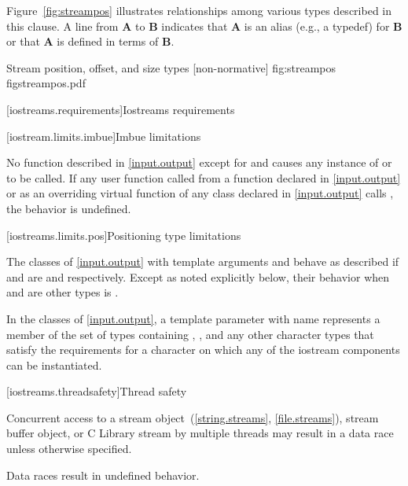 \pnum
Figure~\ref{fig:streampos} illustrates relationships among various types
described in this clause. A line from \textbf{A} to \textbf{B} indicates that \textbf{A}
is an alias (e.g., a typedef) for \textbf{B} or that \textbf{A} is defined in terms of
\textbf{B}.

\begin{importgraphic}
{Stream position, offset, and size types [non-normative]}
{fig:streampos}
{figstreampos.pdf}
\end{importgraphic}

[iostreams.requirements]{Iostreams requirements}

[iostream.limits.imbue]{Imbue limitations}

\pnum
No function described in \ref{input.output} except for
and 
causes any instance of
or
to be called.
If any user function called from a function declared in \ref{input.output} or
as an overriding virtual function of any class declared in \ref{input.output}
calls
,
the behavior is undefined.

[iostreams.limits.pos]{Positioning type limitations}

\pnum
The classes of \ref{input.output} with template arguments
and
behave as described if
and
are
and
respectively.
Except as noted explicitly below, their behavior when
and
are other types is
.

\pnum
In the classes of \ref{input.output}, a template parameter with name
 represents a member of the set of types containing , ,
and any other 
character types that satisfy the requirements for a character on which any of
the iostream components can be instantiated.

[iostreams.threadsafety]{Thread safety}

\pnum
Concurrent access to a stream object~(\ref{string.streams}, \ref{file.streams}), stream buffer
object, or C Library stream by multiple threads may result in
a data race unless otherwise specified.
\begin{note} Data races result in undefined behavior. \end{note}

